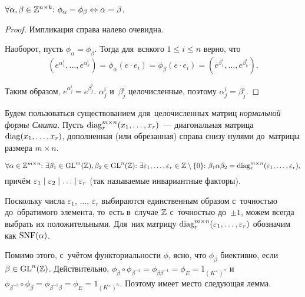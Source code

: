 \documentclass{article}
\begin{document}
\begin{lemma*}
    $
        \forall \alpha, \beta \in \mathbb{Z}^{n \times k}{:} \ \phi_\alpha = \phi_\beta \Leftrightarrow \alpha = \beta
    $.
\end{lemma*}

\begin{proof}
    Импликация справа налево очевидна.

    Наоборот, пусть $\phi_\alpha = \phi_\beta$. Тогда для~всякого $1 \leq i \leq n$ верно, что
    $$
        (e^{\alpha_1^i}, \ldots, e^{\alpha_k^i}) = \phi_\alpha(e \cdot e_i) = \phi_\beta(e \cdot e_i) = (e^{\beta_1^i}, \ldots, e^{\beta_k^i}).
    $$

    Таким образом, $e^{\alpha_j^i} = e^{\beta_j^i}$. $\alpha_j^i$ и~$\beta_j^i$ целочисленные, поэтому $\alpha_j^i = \beta_j^i$.
\end{proof}

Будем пользоваться существованием для~целочисленных матриц \textit{нормальной формы Смита.}
Пусть $\mathrm{diag}^{m \times n}_r(x_1, \ldots, x_r)$~— диагональная матрица $\mathrm{diag}(x_1, \ldots, x_r)$,
дополненная (или обрезанная) справа снизу нулями до~матрицы размера $m \times n$.

\begin{theorem*}
    $$
        \forall \alpha \in \mathbb{Z}^{m \times n}{:}\
        \exists \beta_1 \in \mathrm{GL}^m(\mathbb{Z}), \beta_2 \in \mathrm{GL}^n(\mathbb{Z}){:} \
        \exists \varepsilon_1, \ldots, \varepsilon_r \in \mathbb{Z} \setminus \{0\}{:} \
        \beta_1 \alpha \beta_2 = \mathrm{diag}^{m \times n}_r(\varepsilon_1, \ldots, \varepsilon_r),
    $$
    причём $\varepsilon_1 \mid \varepsilon_2 \mid \ldots \mid \varepsilon_r$ (так называемые инвариантные факторы).
\end{theorem*}

Поскольку числа $\varepsilon_1$, $\ldots$, $\varepsilon_r$ выбираются единственным образом с~точностью
до~обратимого элемента, то~есть в~случае $\mathbb{Z}$ с~точностью до~$\pm 1$, можем всегда выбрать их положительными.
Для~них матрицу $\mathrm{diag}^{m \times n}_r(\varepsilon_1, \ldots, \varepsilon_r)$ обозначим как $\mathrm{SNF}(\alpha)$.

Помимо этого, с~учётом функториальности $\phi$, ясно, что $\phi_\beta$ биективно, если $\beta \in \mathrm{GL}^n(\mathbb{Z})$.
Действительно, $\phi_\beta \circ \phi_{\beta^{-1}} = \phi_{\beta \beta^{-1}} = \phi_E = 1_{(K^\times)^n}$
и~$\phi_{\beta^{-1}} \circ \phi_\beta = \phi_{\beta^{-1} \beta} = \phi_E = 1_{(K^\times)^n}$.
Поэтому имеет место следующая лемма.
\end{document}
